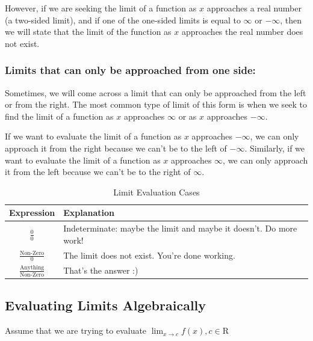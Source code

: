 \documentclass{article}
\begin{document}
However, if we are seeking the limit of a function as $x$ approaches a real number (a two-sided limit), and if one of the one-sided limits is equal to $\infty$ or $-\infty$, then we will state that the limit of the function as $x$ approaches the real number does not exist.
\\
\subsubsection*{Limits that can only be approached from one side:}
Sometimes, we will come across a limit that can only be approached from the left or from the right. The most common type of limit of this form is when we seek to find the limit of a function as $x$ approaches $\infty$ or as $x$ approaches $-\infty$.

If we want to evaluate the limit of a function as $x$ approaches $-\infty$, we can only approach it from the right because we can’t be to the left of $-\infty$. Similarly, if we want to evaluate the limit of a function as $x$ approaches $\infty$, we can only approach it from the left because we can’t be to the right of $\infty$.

\begin{table}[h]
    \centering
    \begin{tabular}{|c|l|}
    \hline
    Expression & Explanation \\
    \hline
    $\frac{0}{0}$ & Indeterminate: maybe the limit and maybe it doesn't. Do more work! \\
    \hline
    $\frac{\text{Non-Zero}}{0}$ & The limit does not exist. You're done working. \\
    \hline 
    $\frac{\text{Anything}}{\text{Non-Zero}}$ & That's the answer :) \\
    \hline
    \end{tabular}
    \caption{Limit Evaluation Cases}
    \label{tab:limits}
\end{table}

\newpage

\subsection{Evaluating Limits Algebraically}
Assume that we are trying to evaluate $\lim_{x \to c}f(x), c \in \mathrm{R}$\\
\end{document}
